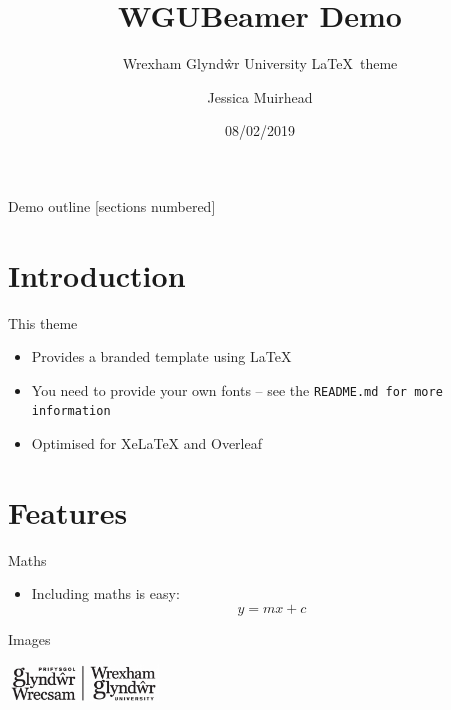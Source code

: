 \documentclass[aspectratio=169,10pt,handout]{beamer}
\title{WGUBeamer Demo}
\subtitle{Wrexham Glyndŵr University \LaTeX~theme}
\date{08/02/2019}
\author{Jessica Muirhead}
\institute{}
\begin{document}
\maketitle

\begin{frame}{Demo outline}
  [sections numbered]
  \tableofcontents[hideallsubsections]
\end{frame}

\section{Introduction}

\begin{frame}{This theme}
    \begin{itemize}
        \item<1-> Provides a branded template using \LaTeX
        \item<2-> You need to provide your own fonts -- see the \texttt{README.md for more information}
        \item<3-> Optimised for XeLaTeX and Overleaf
    \end{itemize}
\end{frame}

\section{Features}

\begin{frame}{Maths}
    \begin{itemize}
        \item<1-> Including maths is easy:
        $$ y = mx+c $$
    \end{itemize}
\end{frame}

\begin{frame}{Images}
    \begin{center}
        \includegraphics[width=40mm]{WGUBeamer/wgulogo.png}
    \end{center}
\end{frame}
\end{document}
